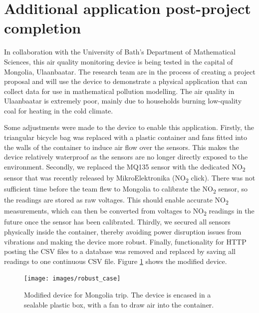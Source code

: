 \documentclass[11pt]{report}
\begin{document}
\section{Additional application post-project completion}

In collaboration with the University of Bath's Department of Mathematical Sciences, this air quality monitoring device is being tested in the capital of Mongolia, Ulaanbaatar. The research team are in the process of creating a project proposal and will use the device to demonstrate a physical application that can collect data for use in mathematical pollution modelling. The air quality in Ulaanbaatar is extremely poor, mainly due to households burning low-quality coal for heating in the cold climate.

Some adjustments were made to the device to enable this application. Firstly, the triangular bicycle bag was replaced with a plastic container and fans fitted into the walls of the container to induce air flow over the sensors. This makes the device relatively waterproof as the sensors are no longer directly exposed to the environment. Secondly, we replaced the MQ135 sensor with the dedicated NO\textsubscript{2} sensor that was recently released by MikroElektronika (NO\textsubscript{2} click). There was not sufficient time before the team flew to Mongolia to calibrate the NO\textsubscript{2} sensor, so the readings are stored as raw voltages. This should enable accurate NO\textsubscript{2} measurements, which can then be converted from voltages to NO\textsubscript{2} readings in the future once the sensor has been calibrated. Thirdly, we secured all sensors physically inside the container, thereby avoiding power disruption issues from vibrations and making the device more robust. Finally, functionality for HTTP posting the CSV files to a database was removed and replaced by saving all readings to one continuous CSV file. Figure \ref{fig:modified_device} shows the modified device.

\begin{figure}[!tb]
\centering
\texttt{[image: images/robust\_case]}
\caption[Modified device for Mongolia trip.]{Modified device for Mongolia trip. The device is encased in a sealable plastic box, with a fan to draw air into the container.}
\label{fig:modified_device}
\end{figure}


\end{document}
